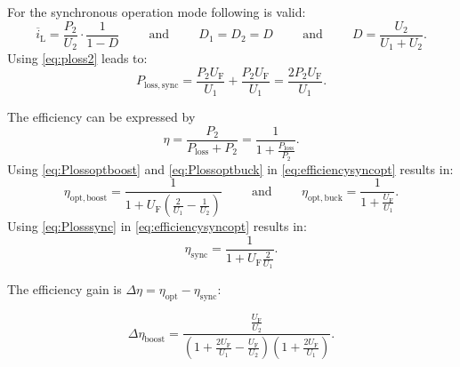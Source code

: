 \begin{solutionblock}
	For the synchronous operation mode following is valid:
	\begin{equation}
		\overline{i}_\mathrm{L}=\frac{P_\mathrm{2}}{U_\mathrm{2}} \cdot \frac{1}{1-D}
		\hspace{1cm} \mathrm{and} \hspace{1cm}
		D_1=D_2=D
		\hspace{1cm} \mathrm{and} \hspace{1cm}
		D=\frac{U_\mathrm{2}}{U_\mathrm{1}+U_\mathrm{2}}.
	\end{equation}
	Using \eqref{eq:ploss2} leads to:
	\begin{equation}
		P_\mathrm{loss,sync}=\frac{P_\mathrm{2} U_\mathrm{F}}{U_\mathrm{1}} + \frac{P_\mathrm{2} U_\mathrm{F}}{U_\mathrm{1}}=\frac{2 P_\mathrm{2} U_\mathrm{F}}{U_\mathrm{1}}.
		\label{eq:Plosssync}
	\end{equation}

	The efficiency can be expressed by
	\begin{equation}
		\eta = \frac{P_\mathrm{2}}{P_\mathrm{loss}+P_\mathrm{2}}=\frac{1}{1+\frac{P_\mathrm{loss}}{P_\mathrm{2}}}.
		\label{eq:efficiencysyncopt}
	\end{equation}
	Using \eqref{eq:Plossoptboost} and \eqref{eq:Plossoptbuck} in \eqref{eq:efficiencysyncopt} results in:
	\begin{equation}
		\eta_\mathrm{opt,boost} = \frac{1}{1+U_\mathrm{F} \left(\frac{2}{U_\mathrm{1}}-\frac{1}{U_\mathrm{2}}\right)}
		\hspace{1cm} \mathrm{and} \hspace{1cm}
		\eta_\mathrm{opt,buck} = \frac{1}{1+\frac{U_\mathrm{F}}{U_\mathrm{1}}}.
		\label{eq:efficiencyopt}
	\end{equation}
	Using \eqref{eq:Plosssync} in \eqref{eq:efficiencysyncopt} results in:
	\begin{equation}
		\eta_\mathrm{sync} = \frac{1}{1+U_\mathrm{F} \frac{2}{U_\mathrm{1}}}.
		\label{eq:efficiencysync}
	\end{equation}

	The efficiency gain is $\Delta \eta=\eta_\mathrm{opt}-\eta_\mathrm{sync}$:

	\begin{equation}
		\Delta \eta_\mathrm{boost}= \frac{\frac{U_\mathrm{F}}{U_\mathrm{2}}}{\left(1+ \frac{2 U_\mathrm{F}}{U_\mathrm{1}}-\frac{U_\mathrm{F}}{U_\mathrm{2}} \right) \left(1+\frac{2 U_\mathrm{F}}{U_\mathrm{1}}\right)}.
		\label{eq:efficiencygainboost}
	\end{equation}


\end{solutionblock}

